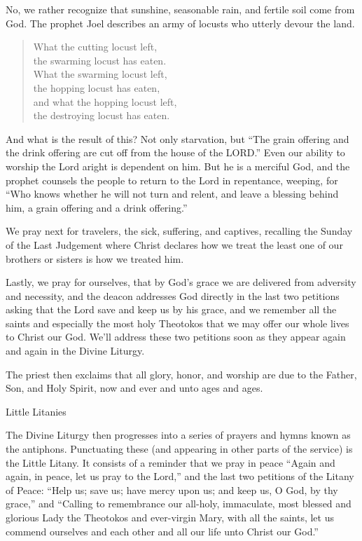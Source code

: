 \documentclass[
]{article}
\begin{document}
No, we rather recognize that sunshine, seasonable rain, and fertile soil
come from God. The prophet Joel describes an army of locusts who utterly
devour the land.

\begin{quote}
What the cutting locust left,\\
the swarming locust has eaten.\\
What the swarming locust left,\\
the hopping locust has eaten,\\
and what the hopping locust left,\\
the destroying locust has eaten.
\end{quote}

And what is the result of this? Not only starvation, but ``The grain
offering and the drink offering are cut off from the house of the
LORD.'' Even our ability to worship the Lord aright is dependent on him.
But he is a merciful God, and the prophet counsels the people to return
to the Lord in repentance, weeping, for ``Who knows whether he will not
turn and relent, and leave a blessing behind him, a grain offering and a
drink offering.''

We pray next for travelers, the sick, suffering, and captives, recalling
the Sunday of the Last Judgement where Christ declares how we treat the
least one of our brothers or sisters is how we treated him.

Lastly, we pray for ourselves, that by God's grace we are delivered from
adversity and necessity, and the deacon addresses God directly in the
last two petitions asking that the Lord save and keep us by his grace,
and we remember all the saints and especially the most holy Theotokos
that we may offer our whole lives to Christ our God. We'll address these
two petitions soon as they appear again and again in the Divine Liturgy.

The priest then exclaims that all glory, honor, and worship are due to
the Father, Son, and Holy Spirit, now and ever and unto ages and ages.

Little Litanies

The Divine Liturgy then progresses into a series of prayers and hymns
known as the antiphons. Punctuating these (and appearing in other parts
of the service) is the Little Litany. It consists of a reminder that we
pray in peace ``Again and again, in peace, let us pray to the Lord,''
and the last two petitions of the Litany of Peace: ``Help us; save us;
have mercy upon us; and keep us, O God, by thy grace,'' and ``Calling to
remembrance our all-holy, immaculate, most blessed and glorious Lady the
Theotokos and ever-virgin Mary, with all the saints, let us commend
ourselves and each other and all our life unto Christ our God.''
\end{document}
